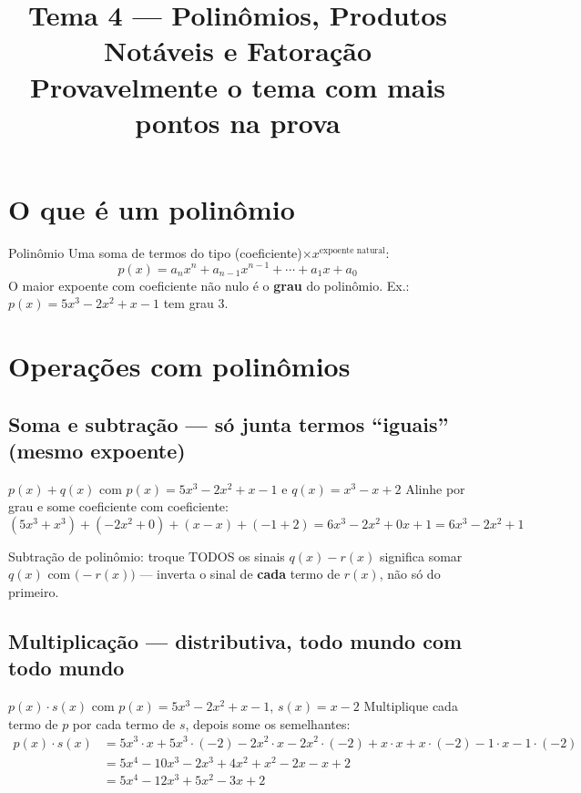 \documentclass[12pt,a4paper]{article}
\title{\vspace{-1.5cm}\textbf{Tema 4 — Polinômios, Produtos Notáveis e Fatoração}\\[2pt]\large Provavelmente o tema com mais pontos na prova}
\author{}
\date{}
\begin{document}
\maketitle
\thispagestyle{empty}

\section{O que é um polinômio}

\begin{definicao}{Polinômio}
Uma soma de termos do tipo (coeficiente)$\times x^{\text{expoente natural}}$:
\[
p(x) = a_nx^n + a_{n-1}x^{n-1} + \cdots + a_1x + a_0
\]
O maior expoente com coeficiente não nulo é o \textbf{grau} do polinômio.
Ex.: $p(x) = 5x^3-2x^2+x-1$ tem grau $3$.
\end{definicao}

\section{Operações com polinômios}

\subsection{Soma e subtração — só junta termos ``iguais'' (mesmo expoente)}

\begin{exemplo}{$p(x)+q(x)$ com $p(x)=5x^3-2x^2+x-1$ e $q(x)=x^3-x+2$}
Alinhe por grau e some coeficiente com coeficiente:
\[
(5x^3+x^3) + (-2x^2+0) + (x-x) + (-1+2) = 6x^3-2x^2+0x+1 = 6x^3-2x^2+1
\]
\end{exemplo}

\begin{atencao}{Subtração de polinômio: troque TODOS os sinais}
$q(x)-r(x)$ significa somar $q(x)$ com $\bigl(-r(x)\bigr)$ — inverta o sinal
de \textbf{cada} termo de $r(x)$, não só do primeiro.
\end{atencao}

\subsection{Multiplicação — distributiva, todo mundo com todo mundo}

\begin{exemplo}{$p(x)\cdot s(x)$ com $p(x)=5x^3-2x^2+x-1$, $s(x)=x-2$}
Multiplique cada termo de $p$ por cada termo de $s$, depois some os
semelhantes:
\begin{align*}
p(x)\cdot s(x) &= 5x^3\cdot x + 5x^3\cdot(-2) -2x^2\cdot x -2x^2\cdot(-2) + x\cdot x + x\cdot(-2) -1\cdot x -1\cdot(-2)\\
&= 5x^4 -10x^3 -2x^3+4x^2 +x^2-2x -x+2\\
&= 5x^4 -12x^3+5x^2-3x+2
\end{align*}
\end{exemplo}
\end{document}
